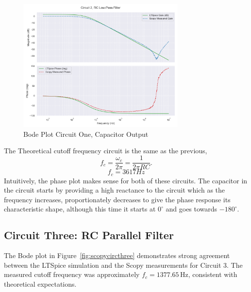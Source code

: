 \documentclass[12pt]{article}
\begin{document}
\begin{figure}[H]
	\centering
	\includegraphics[width=0.75\textwidth]{e6_bode2}
	\caption{Bode Plot Circuit One, Capacitor Output}
	\label{fig:scopycirc2}
\end{figure}

The Theoretical cutoff frequency circuit is the same as the previous,\[
	f_c = \frac{\omega_c}{2\pi} = \frac{1}{2\pi RC}.
	\]
	\[
		f_c = 3617Hz
		\]
		Intuitively, the phase plot makes sense for both of these circuits. The
		capacitor in the circuit starts by providing a high reactance to the circuit
		which as the frequency increases, proportionately decreases to give the
		phase response its characteristic shape, although this time it starts at
		$0^\circ$ and goes towards $-180^\circ$.

\subsection{Circuit Three: RC Parallel Filter}

The Bode plot in Figure~\ref{fig:scopycircthree} demonstrates strong agreement between the LTSpice simulation and the Scopy measurements for Circuit 3. The measured cutoff frequency was approximately $f_c = 1377.65\,\mathrm{Hz}$, consistent with theoretical expectations.
\end{document}
